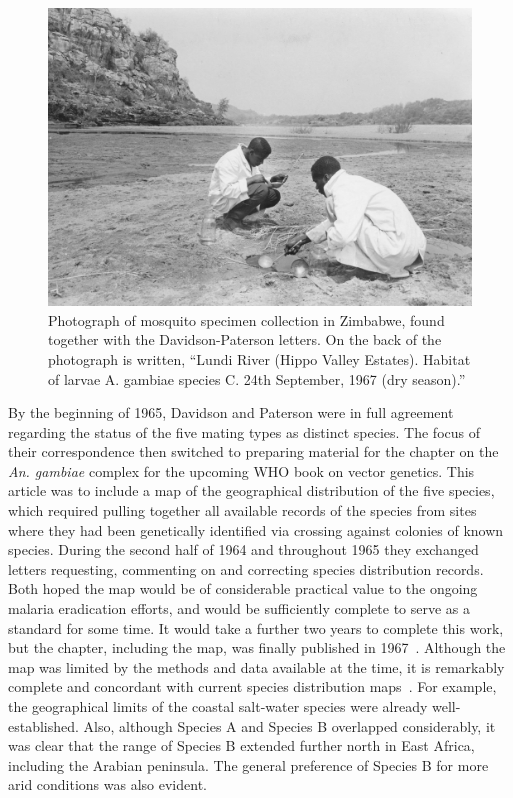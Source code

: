 \begin{refsection}
\begin{figure}[t]
\centering
\includegraphics[width=\textwidth]{davidson-letters/Photo-Zimbabwe-Lundi.pdf}
\caption{Photograph of mosquito specimen collection in Zimbabwe, found together with the Davidson-Paterson letters. On the back of the photograph is written, ``Lundi River (Hippo Valley Estates). Habitat of larvae A. gambiae species C. 24th September, 1967 (dry season).''}
    \label{fig:photo-lundi}
\end{figure}


By the beginning of 1965, Davidson and Paterson were in full agreement regarding the status of the five mating types as distinct species.
%
The focus of their correspondence then switched to preparing material for the chapter on the \textit{An. gambiae} complex for the upcoming WHO book on vector genetics.
%
This article was to include a map of the geographical distribution of the five species, which required pulling together all available records of the species from sites where they had been genetically identified via crossing against colonies of known species.
%
During the second half of 1964 and throughout 1965 they exchanged letters requesting, commenting on and correcting species distribution records.
%
Both hoped the map would be of considerable practical value to the ongoing malaria eradication efforts, and would be sufficiently complete to serve as a standard for some time.
%
It would take a further two years to complete this work, but the chapter, including the map, was finally published in 1967~\parencite{Davidson1967}.
%
Although the map was limited by the methods and data available at the time, it is remarkably complete and concordant with current species distribution maps~\parencite{Wiebe2017}.
%
For example, the geographical limits of the coastal salt-water species were already well-established.
%
Also, although Species A and Species B overlapped considerably, it was clear that the range of Species B extended further north in East Africa, including the Arabian peninsula.
%
The general preference of Species B for more arid conditions was also evident.



\end{refsection}
